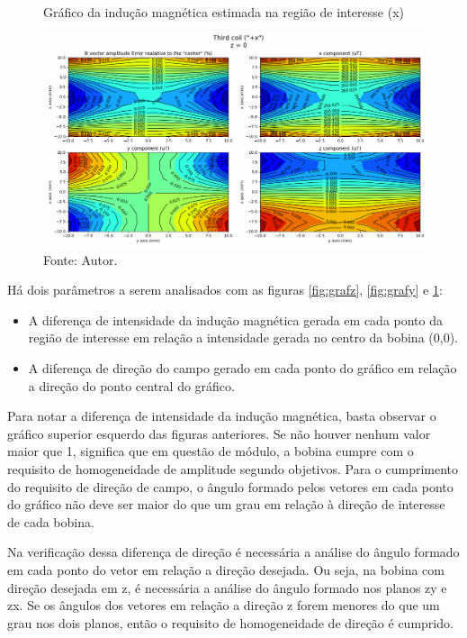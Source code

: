 \begin{figure}[H]
    \centering
     \caption{Gráfico da indução magnética estimada na região de interesse (x)}
     \includegraphics[width=1\textwidth]{./img/simulacao/thirdCoilx.png}
     \caption*{Fonte: Autor.}\label{fig:grafx}
\end{figure}

Há dois parâmetros a serem analisados com as figuras \ref{fig:grafz}, \ref{fig:grafy} e \ref{fig:grafx}: 

\begin{itemize}
    \item A diferença de intensidade da indução magnética gerada em cada ponto da região de interesse em relação a intensidade gerada no centro da bobina (0,0).
    \item A diferença de direção do campo gerado em cada ponto do gráfico em relação a direção do ponto central do gráfico.
\end{itemize}

Para notar a diferença de intensidade da indução magnética, basta observar o gráfico superior esquerdo das figuras anteriores. Se não houver nenhum valor maior que 1,  significa que em questão de módulo, a bobina cumpre com o requisito de homogeneidade de amplitude segundo objetivos. Para o cumprimento do requisito de direção de campo, o ângulo formado pelos vetores em cada ponto do gráfico não deve ser maior do que um grau em relação à direção de interesse de cada bobina.

Na verificação dessa diferença de direção é necessária a análise do ângulo formado em cada ponto do vetor em relação a direção desejada. Ou seja, na bobina com direção desejada em z, é necessária a análise do ângulo formado nos planos zy e zx. Se os ângulos dos vetores em relação a direção z forem menores do que um grau nos dois planos, então o requisito de homogeneidade de direção é cumprido.

